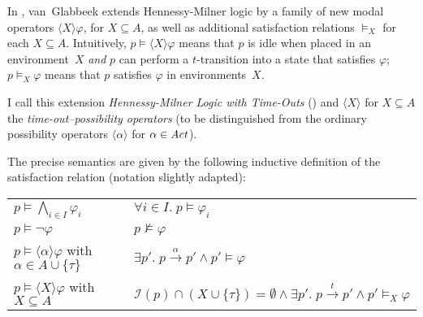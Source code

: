 %
\begin{isabellebody}%
%
%
\isadelimtheory
%
\endisadelimtheory
%
\isatagtheory
%
\endisatagtheory
{\isafoldtheory}%
%
\isadelimtheory
%
\endisadelimtheory
%
\isadelimdocument
%
\endisadelimdocument
%
\isatagdocument
%
\isamarkuptrue%
%
\endisatagdocument
{\isafolddocument}%
%
\isadelimdocument
%
\endisadelimdocument
%
\begin{isamarkuptext}%
\label{sec:HMLt}%
\end{isamarkuptext}\isamarkuptrue%
%
\begin{isamarkuptext}%
In \cite[Section 3]{rbs}, van~Glabbeek extends Hennessy-Milner logic by a family of new modal operators $\langle X \rangle \varphi$, for $X \subseteq A$, as well as additional satisfaction relations $\vDash_X$ for each $X \subseteq A$. Intuitively, $p \vDash \langle X \rangle \varphi$ means that $p$ is idle when placed in an environment~$X$ \emph{and} $p$ can perform a $t$-transition into a state that satisfies $\varphi$; $p \vDash_X \varphi$ means that $p$ satisfies $\varphi$ in environments~$X$.

I call this extension \emph{Hennessy-Milner Logic with Time-Outs} (\HMLt{}) and $\langle X \rangle$ for $X \subseteq A$ the \emph{time-out--possibility operators} (to be distinguished from the ordinary possibility operators $\langle \alpha \rangle$ for $\alpha \in \mathit{Act}$).

The precise semantics are given by the following inductive definition of the satisfaction relation \cite[Section 3]{rbs} (notation slightly adapted):

\begin{tabular}{l l l}
    $p \vDash \bigwedge_{i \in I} \varphi_i$ 
    & \text{if} 
    & $\forall i \in I.\; p \vDash \varphi_i$ \\
    
    $p \vDash \neg\varphi$
    & \text{if} 
    & $p \not\vDash \varphi$ \\
    
    $p \vDash \langle \alpha \rangle \varphi$ \quad with $\alpha \in A \cup \{\tau\}$
    & \text{if} 
    & $\exists p'.\; p \xrightarrow{\alpha} p' \wedge p' \vDash \varphi$ \\
    
    $p \vDash \langle X \rangle \varphi$ \quad with $X \subseteq A$
    & \text{if} 
    & $\mathcal{I}(p) \cap (X \cup \{\tau\}) = \emptyset \wedge \exists p'.\; p \xrightarrow{t} p' \wedge p' \vDash_X \varphi$ \\[1em]
    

\end{tabular}
\end{isamarkuptext}
\end{isabellebody}
